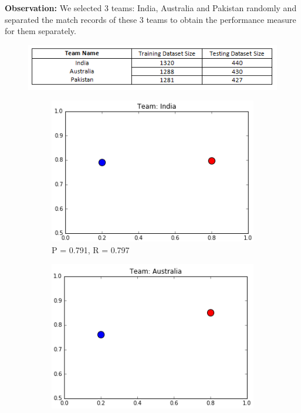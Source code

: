 \documentclass[a4paper, 10pt, conference]{IEEEtran}
\begin{document}
\textbf{Observation:}
We selected 3 teams: India, Australia and Pakistan randomly and separated the match records of these 3 teams to obtain the performance measure for them separately.
\begin{figure}[h!]
  \includegraphics[width=\linewidth]{DatasetTeam.png}
  \label{fig:teamdata}
\end{figure}

\begin{figure}[h!]
  \centering
  \begin{subfigure}[b]{0.4\linewidth}
    \includegraphics[width=\linewidth]{MLPCLF_India.png}
    \caption{P = 0.791, R = 0.797}
  \end{subfigure}
  \begin{subfigure}[b]{0.4\linewidth}
    \includegraphics[width=\linewidth]{MLPCLF_Australia.png}

\end{subfigure}
\end{figure}
\end{document}
